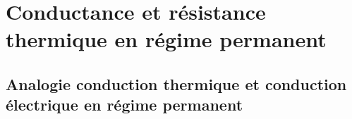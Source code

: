 \section{Conductance et résistance thermique en régime permanent}
    \subsection{Analogie conduction thermique et conduction électrique en régime permanent}